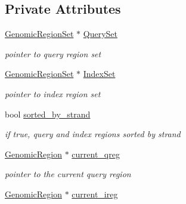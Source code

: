 \subsection*{Private Attributes}
\begin{CompactItemize}
\item 
\hypertarget{classGenomicRegionSetOverlapScanner_f74bf7176b25f99da4c38e84f50efb75}{
\hyperlink{classGenomicRegionSet}{GenomicRegionSet} $\ast$ \hyperlink{classGenomicRegionSetOverlapScanner_f74bf7176b25f99da4c38e84f50efb75}{QuerySet}}
\label{classGenomicRegionSetOverlapScanner_f74bf7176b25f99da4c38e84f50efb75}

\begin{CompactList}\small\item\em pointer to query region set \item\end{CompactList}\item 
\hypertarget{classGenomicRegionSetOverlapScanner_6c9bb71f3f0479b0f773d13315a64162}{
\hyperlink{classGenomicRegionSet}{GenomicRegionSet} $\ast$ \hyperlink{classGenomicRegionSetOverlapScanner_6c9bb71f3f0479b0f773d13315a64162}{IndexSet}}
\label{classGenomicRegionSetOverlapScanner_6c9bb71f3f0479b0f773d13315a64162}

\begin{CompactList}\small\item\em pointer to index region set \item\end{CompactList}\item 
\hypertarget{classGenomicRegionSetOverlapScanner_03774130ef410465b36be25ae28682e7}{
bool \hyperlink{classGenomicRegionSetOverlapScanner_03774130ef410465b36be25ae28682e7}{sorted\_\-by\_\-strand}}
\label{classGenomicRegionSetOverlapScanner_03774130ef410465b36be25ae28682e7}

\begin{CompactList}\small\item\em if true, query and index regions sorted by strand \item\end{CompactList}\item 
\hypertarget{classGenomicRegionSetOverlapScanner_b802e705ad9fcfdb95fa665c26d1c610}{
\hyperlink{classGenomicRegion}{GenomicRegion} $\ast$ \hyperlink{classGenomicRegionSetOverlapScanner_b802e705ad9fcfdb95fa665c26d1c610}{current\_\-qreg}}
\label{classGenomicRegionSetOverlapScanner_b802e705ad9fcfdb95fa665c26d1c610}

\begin{CompactList}\small\item\em pointer to the current query region \item\end{CompactList}\item 
\hypertarget{classGenomicRegionSetOverlapScanner_44fafd1bccf2b4610bf1979ca0b05c27}{
\hyperlink{classGenomicRegion}{GenomicRegion} $\ast$ \hyperlink{classGenomicRegionSetOverlapScanner_44fafd1bccf2b4610bf1979ca0b05c27}{current\_\-ireg}}
\label{classGenomicRegionSetOverlapScanner_44fafd1bccf2b4610bf1979ca0b05c27}


\end{CompactItemize}
